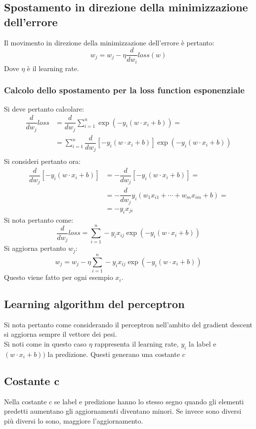 	\subsection{Spostamento in direzione della minimizzazione dell'errore}
	Il movimento in direzione della minimizzazione dell'errore \`e pertanto:
	$$w_j = w_j - \eta \dfrac{d}{dw_i}loss(w)$$
	Dove $\eta$ \`e il learning rate.

		\subsubsection{Calcolo dello spostamento per la loss function esponenziale}
		Si deve pertanto calcolare:
		\begin{align*}
			\dfrac{d}{dw_j}loss &=\dfrac{d}{dw_j}\sum\limits_{i=1}^n\exp(-y_i(w\cdot x_i + b))=\\
												 &=\sum\limits_{i=1}^n\dfrac{d}{dw_j}[-y_i(w\cdot x_i+b)]\exp(-y_i(w\cdot x_i+b))\\
		\end{align*}
		Si consideri pertanto ora:
		\begin{align*}
			\dfrac{d}{dw_j}[-y_i(w\cdot x_i + b)]&=-\dfrac{d}{dw_j}[-y_i(w\cdot x_i + b)]=\\
																		&=-\dfrac{d}{dw_j}y_i(w_1x_{i1}+\cdots+w_mx_{im}+b)=\\
																		&=-y_ix_{ji}
		\end{align*}
		Si nota pertanto come:
		$$\dfrac{d}{dw_j}loss=\sum\limits_{i=1}^n-y_ix_{ij}\exp(-y_i(w\cdot x_i+b))$$
		Si aggiorna pertanto $w_j$:
		$$w_j=w_j-\eta\sum\limits_{i=1}^n-y_ix_{ij}\exp(-y_i(w\cdot x_i+b))$$
		Questo viene fatto per ogni esempio $x_i$.

	\subsection{Learning algorithm del perceptron}
	Si nota pertanto come considerando il perceptron nell'ambito del gradient descent si aggiorna sempre il vettore dei pesi.\\
	
	Si noti come in questo caso $\eta$ rappresenta il learning rate, $y_i$ la label e $(w\cdot x_i + b))$ la predizione.
	Questi generano una costante $c$

	\subsection{Costante $\mathbf{c}$}
	Nella costante $c$ se label e predizione hanno lo stesso segno quando gli elementi predetti aumentano gli aggiornamenti diventano minori.
	Se invece sono diversi pi\`u diversi lo sono, maggiore l'aggiornamento.

